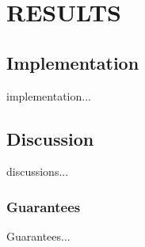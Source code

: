 
\chapter{\uppercase{Results}}

\section{Implementation}

implementation...

\section{Discussion}

discussions...

\subsection{Guarantees}

Guarantees...